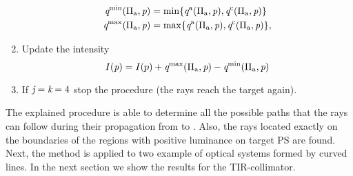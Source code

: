 \begin{enumerate}
\begin{equation*}
\begin{aligned}
\textit{q}^{\textrm{min}}(\Pi_{\textrm{a}}, \textit{p})&=\min\{\textit{q}^{\textrm{a}}(\Pi_{\textrm{a}}, \textit{p}), \textit{q}^{\textrm{c}}(\Pi_{\textrm{a}}, \textit{p})\}\\ 
\textit{q}^{\textrm{max}}(\Pi_{\textrm{a}}, \textit{p})&=\max\{\textit{q}^{\textrm{a}}(\Pi_{\textrm{a}}, \textit{p}), \textit{q}^{\textrm{c}}(\Pi_{\textrm{a}}, \textit{p})\},
\end{aligned}
\end{equation*}
\item Update the intensity $$I(\textit{p}) = I(p)+\textit{q}^{\textrm{max}}(\Pi_{\textrm{a}}, \textit{p})-\textit{q}^{\textrm{min}}(\Pi_{\textrm{a}}, \textit{p})$$
\item If $\textit{j}=\textit{k}= 4$ stop the procedure (the rays reach the target again).
\end{enumerate}
The explained procedure is able to determine all the possible paths that the rays can follow during their propagation from  to . Also, the rays located exactly on the boundaries of the regions with positive luminance on target PS  are found.\\ \indent
Next, the method is applied to two example of optical systems formed by curved lines. In the next section we show the results for the TIR-collimator.
